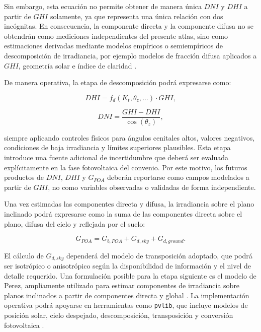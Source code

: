 \documentclass[../main.tex]{subfiles}
\begin{document}
Sin embargo, esta ecuación no permite obtener de manera única $DNI$ y $DHI$ a partir de $GHI$ solamente, ya que representa una única relación con dos incógnitas. En consecuencia, la componente directa y la componente difusa no se obtendrán como mediciones independientes del presente atlas, sino como estimaciones derivadas mediante modelos empíricos o semiempíricos de descomposición de irradiancia, por ejemplo modelos de fracción difusa aplicados a $GHI$, geometría solar e índice de claridad \cite{erbs1982}.

De manera operativa, la etapa de descomposición podrá expresarse como:

\begin{equation}
DHI = f_d(K_t, \theta_z, \ldots) \cdot GHI,
\end{equation}

\begin{equation}
DNI = \frac{GHI - DHI}{\cos(\theta_z)},
\end{equation}

siempre aplicando controles físicos para ángulos cenitales altos, valores negativos, condiciones de baja irradiancia y límites superiores plausibles. Esta etapa introduce una fuente adicional de incertidumbre que deberá ser evaluada explícitamente en la fase fotovoltaica del convenio. Por este motivo, los futuros productos de $DNI$, $DHI$ y $G_{POA}$ deberán reportarse como campos modelados a partir de $GHI$, no como variables observadas o validadas de forma independiente.

Una vez estimadas las componentes directa y difusa, la irradiancia sobre el plano inclinado podrá expresarse como la suma de las componentes directa sobre el plano, difusa del cielo y reflejada por el suelo:

\begin{equation}
G_{POA}
=
G_{b,POA}
+
G_{d,sky}
+
G_{d,ground}.
\end{equation}

El cálculo de $G_{d,sky}$ dependerá del modelo de transposición adoptado, que podrá ser isotrópico o anisotrópico según la disponibilidad de información y el nivel de detalle requerido. Una formulación posible para la etapa siguiente es el modelo de Perez, ampliamente utilizado para estimar componentes de irradiancia sobre planos inclinados a partir de componentes directa y global \cite{perez1990}. La implementación operativa podrá apoyarse en herramientas como \texttt{pvlib}, que incluye modelos de posición solar, cielo despejado, descomposición, transposición y conversión fotovoltaica \cite{pvlib}.
\end{document}

